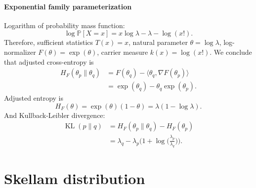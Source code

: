 \documentclass[a4paper,11pt]{article}
\theoremstyle{plain}
\theoremstyle{definition}
\newcommand{\MP}{\mathbb{P}}
\begin{document}
	\paragraph{Exponential family parameterization}
	Logarithm of probability mass function:
	\[
	\log \MP[X = x] = x \log \lambda - \lambda - \log(x!).
	\]
	Therefore, sufficient statistics $T(x) = x$, natural parameter $\theta = \log \lambda$, log-normalizer $F(\theta) = \exp(\theta)$, carrier measure $k(x) = \log(x!)$. We conclude that adjusted cross-entropy is
	\[
	\begin{aligned}
	H_F(\theta_p \| \theta_q) &= F(\theta_q) - \langle \theta_q, \nabla F(\theta_p) \rangle \\
	&= \exp(\theta_q) - \theta_q \exp(\theta_p).
	\end{aligned}
	\]
	Adjusted entropy is
	\[
	H_F(\theta) = \exp(\theta) (1 - \theta) = \lambda (1 - \log \lambda).
	\]
	And Kullback-Leibler divergence:
	\[
	\begin{aligned}
	\operatorname{KL}(p \| q) &= H_F(\theta_p \| \theta_q) - H_F(\theta_p) \\
	&= \lambda_q -  \lambda_p \bigg(1 + \log \bigg(\frac{\lambda_p}{\lambda_q}\bigg)\bigg).
	\end{aligned}
	\]
	
	
	\pagebreak
	\section{Skellam distribution}
	
\end{document}
